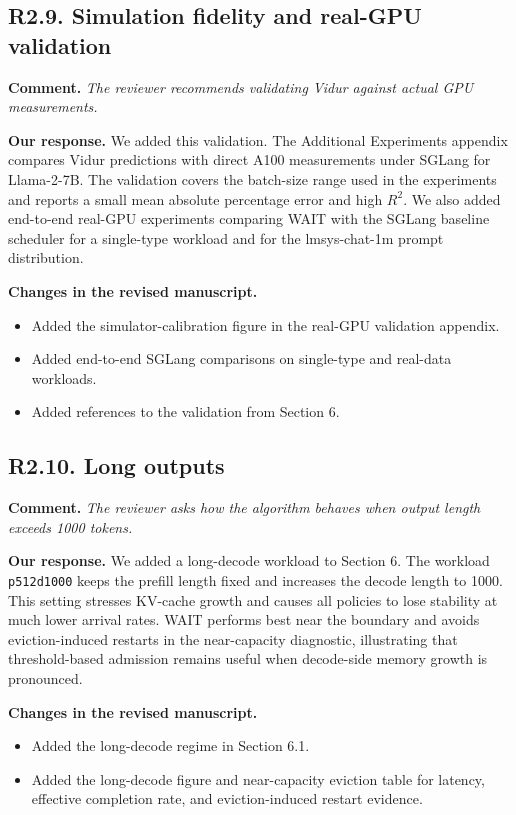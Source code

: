 \documentclass[11pt]{article}
\newcommand{\comment}[1]{%
  \vspace{0.25em}
  \noindent\textbf{Comment.} \emph{#1}
}
\newcommand{\response}{\vspace{0.25em}\noindent\textbf{Our response.} }
\newcommand{\changes}{\vspace{0.25em}\noindent\textbf{Changes in the revised manuscript.} }
\begin{document}
\subsection*{R2.9. Simulation fidelity and real-GPU validation}

\comment{The reviewer recommends validating Vidur against actual GPU measurements.}

\response We added this validation. The Additional Experiments appendix compares Vidur predictions with direct A100 measurements under SGLang for Llama-2-7B. The validation covers the batch-size range used in the experiments and reports a small mean absolute percentage error and high \(R^2\). We also added end-to-end real-GPU experiments comparing WAIT with the SGLang baseline scheduler for a single-type workload and for the lmsys-chat-1m prompt distribution.

\changes
\begin{itemize}
    \item Added the simulator-calibration figure in the real-GPU validation appendix.
    \item Added end-to-end SGLang comparisons on single-type and real-data workloads.
    \item Added references to the validation from Section 6.
\end{itemize}

\subsection*{R2.10. Long outputs}

\comment{The reviewer asks how the algorithm behaves when output length exceeds 1000 tokens.}

\response We added a long-decode workload to Section 6. The workload \texttt{p512d1000} keeps the prefill length fixed and increases the decode length to 1000. This setting stresses KV-cache growth and causes all policies to lose stability at much lower arrival rates. WAIT performs best near the boundary and avoids eviction-induced restarts in the near-capacity diagnostic, illustrating that threshold-based admission remains useful when decode-side memory growth is pronounced.

\changes
\begin{itemize}
    \item Added the long-decode regime in Section 6.1.
    \item Added the long-decode figure and near-capacity eviction table for latency, effective completion rate, and eviction-induced restart evidence.
\end{itemize}
\end{document}
